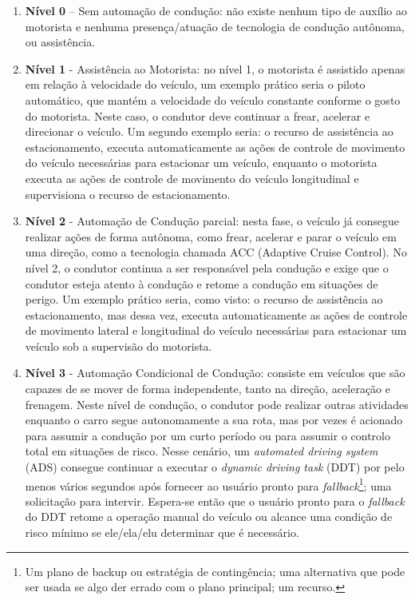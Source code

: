 \begin{enumerate} \label{SAE-level}
 \item \textbf{Nível 0} – Sem automação de condução: não existe nenhum tipo de auxílio ao motorista e nenhuma presença/atuação de tecnologia de condução autônoma, ou assistência.

\item \textbf{Nível 1} - Assistência ao Motorista: no nível 1, o motorista é assistido apenas em relação à velocidade do veículo, um exemplo prático seria o piloto automático, que mantém a velocidade do veículo constante conforme o gosto do motorista. Neste caso, o condutor deve continuar a frear, acelerar e direcionar o veículo. Um segundo exemplo seria: o recurso de assistência ao estacionamento, executa automaticamente as ações de controle de movimento do veículo necessárias para estacionar um veículo, enquanto o motorista executa as ações de controle de movimento do veículo longitudinal e supervisiona o recurso de estacionamento.

\item \textbf{Nível 2} - Automação de Condução parcial: nesta fase, o veículo já consegue realizar ações de forma autônoma, como frear, acelerar e parar o veículo em uma direção, como a tecnologia chamada ACC (Adaptive Cruise Control). No nível 2, o condutor continua a ser responsável pela condução e exige que o condutor esteja atento à condução e retome a condução em situações de perigo. Um exemplo prático seria, como visto: o recurso de assistência ao estacionamento, mas dessa vez, executa automaticamente as ações de controle de movimento lateral e longitudinal do veículo necessárias para estacionar um veículo sob a supervisão do motorista.

\item \textbf{Nível 3} - Automação Condicional de Condução: consiste em veículos que são capazes de se mover de forma independente, tanto na direção, aceleração e frenagem. Neste nível de condução, o condutor pode realizar outras atividades enquanto o carro segue autonomamente a sua rota, mas por vezes é acionado para assumir a condução por um curto período ou para assumir o controlo total em situações de risco. Nesse cenário, um \textit{automated driving system} (ADS)  consegue continuar a executar o \textit{dynamic driving task} (DDT) por pelo menos vários segundos após fornecer ao usuário pronto para \textit{fallback}\footnote{Um plano de backup ou estratégia de contingência; uma alternativa que pode ser usada se algo der errado com o plano principal; um recurso.}; uma solicitação para intervir. Espera-se então que o usuário pronto para o \textit{fallback} do DDT retome a operação manual do veículo ou alcance uma condição de risco mínimo se ele/ela/elu determinar que é necessário.


\end{enumerate}
